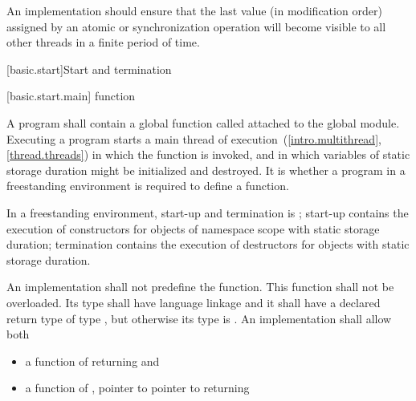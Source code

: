 \pnum
An implementation should ensure that the last value (in modification order)
assigned by an atomic or synchronization operation will become visible to all
other threads in a finite period of time.%
%

[basic.start]{Start and termination}

[basic.start.main]{ function}

\pnum
{}%
A program shall contain a global function called 
attached to the global module.
Executing a program starts a main thread of execution~(\ref{intro.multithread}, \ref{thread.threads})
in which the  function is invoked,
and in which variables of static storage duration
might be initialized and destroyed.
It is 
whether a program in a freestanding environment is required to define a 
function. \begin{note} In a freestanding environment, start-up and termination is
; start-up contains the
execution of constructors for objects of namespace scope with static storage duration;
termination contains the execution of destructors for objects with static storage
duration. \end{note}

\pnum
An implementation shall not predefine the  function. This
function shall not be overloaded.  Its type shall have \Cpp{} language linkage
and it shall have a declared return type of type
, but otherwise its type is .
%
An implementation shall allow both
\begin{itemize}
\item a function of \tcode{()} returning  and
\item a function of , pointer to pointer to  returning 
\end{itemize}

